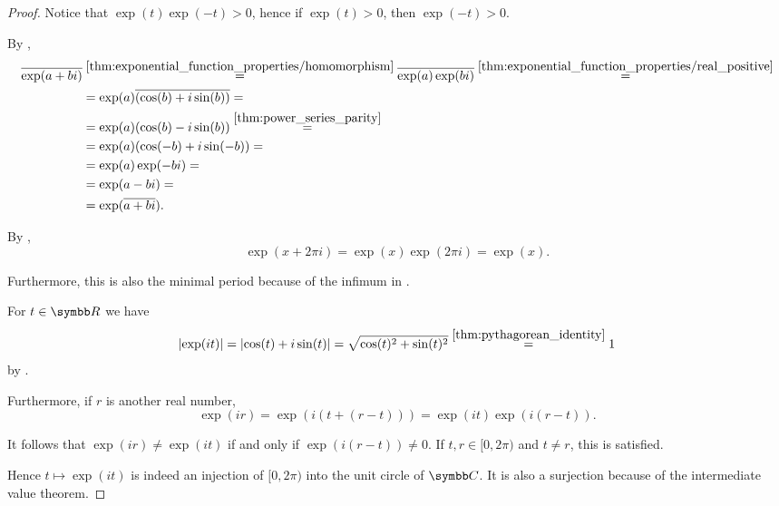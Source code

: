 \begin{proof}
  Notice that \( \exp(t) \exp(-t) > 0 \), hence if \( \exp(t) > 0 \), then \( \exp(-t) > 0 \).

   By ,
  \begin{align*}
    \overline{\exp(a + bi)}
    &\overset {\ref{thm:exponential_function_properties/homomorphism}} =
    \overline{\exp(a) \exp(bi)}
    \overset {\ref{thm:exponential_function_properties/real_positive}} = \\ &=
    \exp(a) \overline{(\cos(b) + i\sin(b))}
    = \\ &=
    \exp(a) (\cos(b) - i\sin(b))
    \overset {\ref{thm:power_series_parity}} = \\ &=
    \exp(a) (\cos(-b) + i\sin(-b))
    = \\ &=
    \exp(a) \exp(-bi)
    = \\ &=
    \exp(a - bi)
    = \\ &=
    \exp(\overline{a + bi}).
  \end{align*}

   By ,
  \begin{equation*}
    \exp(x + 2\pi i) = \exp(x) \exp(2 \pi i) = \exp(x).
  \end{equation*}

  Furthermore, this is also the minimal period because of the infimum in .

   For \( t \in \BR \) we have
  \begin{equation*}
    \left\vert \exp(it) \right\vert
    =
    \left\vert \cos(t) + i\sin(t) \right\vert
    =
    \sqrt{\cos(t)^2 + \sin(t)^2}
    \overset {\ref{thm:pythagorean_identity}} =
    1
  \end{equation*}
  by .

  Furthermore, if \( r \) is another real number,
  \begin{equation}
    \exp(ir)
    =
    \exp(i(t + (r - t)))
    =
    \exp(it) \exp(i(r - t)).
  \end{equation}

  It follows that \( \exp(ir) \neq \exp(it) \) if and only if \( \exp(i(r - t)) \neq 0 \). If \( t, r \in [0, 2\pi) \) and \( t \neq r \), this is satisfied.

  Hence \( t \mapsto \exp(it) \) is indeed an injection of \( [0, 2\pi) \) into the unit circle of \( \BC \). It is also a surjection because of the intermediate value theorem.


\end{proof}
